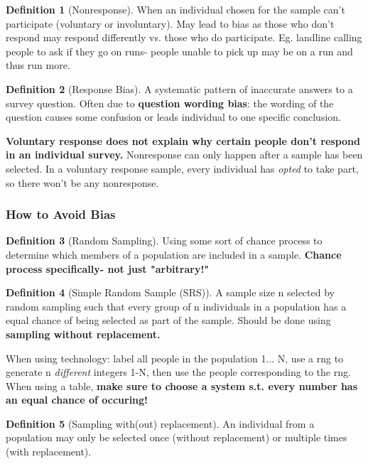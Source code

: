 \documentclass[12pt, a4paper]{article}
\theoremstyle{definition}
\newtheorem{definition}{Definition}
\begin{document}
\begin{definition}[Nonresponse]
    When an individual chosen for the sample can't participate (voluntary or involuntary).
    May lead to bias as those who don't respond may respond differently vs. those who do participate.
    Eg. landline calling people to ask if they go on runs- people unable to pick up may be on a run and thus run more.
\end{definition}

\begin{definition}[Response Bias]
    A systematic pattern of inaccurate answers to a survey question.
    Often due to \textbf{question wording bias}: the wording of the question causes some confusion or leads individual to one specific conclusion.
\end{definition}

\textbf{Voluntary response does not explain why certain people don't respond in an individual survey.}
Nonresponse can only happen after a sample has been selected.
In a voluntary response sample, every individual has \textit{opted} to take part, so there won't be any nonresponse.

\subsubsection{How to Avoid Bias}
\begin{definition}[Random Sampling]
    Using some sort of chance process to determine which members of a population are included in a sample.
    \textbf{Chance process specifically- not just "arbitrary!"}
\end{definition}

\begin{definition}[Simple Random Sample (SRS)]
    A sample size n selected by random sampling such that every group of n individuals in a population has a equal chance of being selected as part of the sample.
    Should be done using \textbf{sampling without replacement.}

    When using technology: label all people in the population 1... N, use a rng to generate n \textit{different} integers 1-N, then use the people corresponding to the rng.
    When using a table, \textbf{make sure to choose a system s.t. every number has an equal chance of occuring!}
\end{definition}

\begin{definition}[Sampling with(out) replacement]
    An individual from a population may only be selected once (without replacement) or multiple times (with replacement).
\end{definition}
\end{document}
